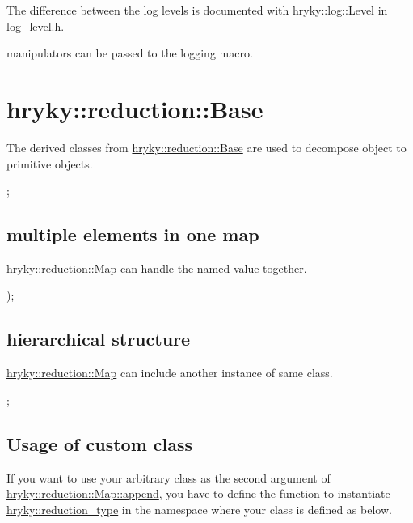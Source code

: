 The difference between the log levels is documented with hryky\-::log\-::\-Level in log\-\_\-level.\-h.



manipulators can be passed to the logging macro. 
\begin{DoxyCodeInclude}

\end{DoxyCodeInclude}
\hypertarget{hryky_1_1log_reduction}{}\section{hryky\-::reduction\-::\-Base}\label{hryky_1_1log_reduction}
The derived classes from \hyperlink{classhryky_1_1reduction_1_1_base}{hryky\-::reduction\-::\-Base} are used to decompose object to primitive objects.




\begin{DoxyCodeInclude}

\end{DoxyCodeInclude}
 ;\hypertarget{hryky_1_1log_aggregation}{}\subsection{multiple elements in one map}\label{hryky_1_1log_aggregation}
\hyperlink{classhryky_1_1reduction_1_1_map}{hryky\-::reduction\-::\-Map} can handle the named value together.


\begin{DoxyCodeInclude}

\end{DoxyCodeInclude}
 );\hypertarget{hryky_1_1log_nested}{}\subsection{hierarchical structure}\label{hryky_1_1log_nested}
\hyperlink{classhryky_1_1reduction_1_1_map}{hryky\-::reduction\-::\-Map} can include another instance of same class.


\begin{DoxyCodeInclude}

\end{DoxyCodeInclude}
 ;\hypertarget{hryky_1_1log_custom}{}\subsection{Usage of custom class}\label{hryky_1_1log_custom}
If you want to use your arbitrary class as the second argument of \hyperlink{classhryky_1_1reduction_1_1_map_a46fcabdd08327b7bdc4c72edb3623e7a}{hryky\-::reduction\-::\-Map\-::append}, you have to define the function to instantiate \hyperlink{namespacehryky_a343a9a4c36a586be5c2693156200eadc}{hryky\-::reduction\-\_\-type} in the namespace where your class is defined as below.


